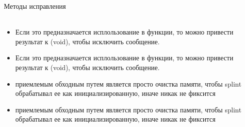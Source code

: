 \documentclass{article}
\begin{document}
\newpage
\huge{Методы исправления} \\ \\
\begin{itemize}
    \item Если это предназначается исплользование в функции, то можно привести результат к (void), чтобы исключить сообщение.
    \item Если это предназначается исплользование в функции, то можно привести результат к (void), чтобы исключить сообщение.
    \item приемлемым обходным путем является просто очистка памяти, чтобы splint обрабатывал ее как инициализированную, иначе никак не фиксится
    \item приемлемым обходным путем является просто очистка памяти, чтобы splint обрабатывал ее как инициализированную, иначе никак не фиксится
\end{itemize}
\end{document}
